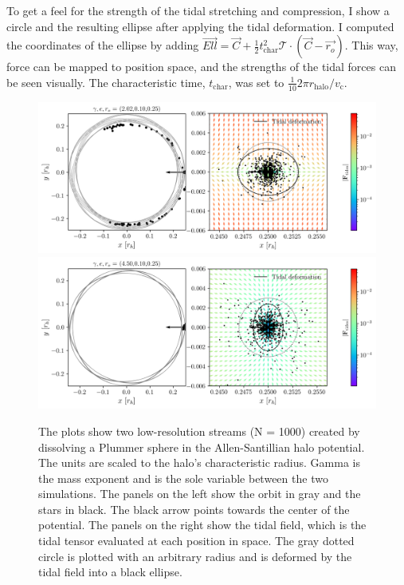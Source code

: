             To get a feel for the strength of the tidal stretching and compression, I show a circle and the resulting ellipse after applying the tidal deformation. I computed the coordinates of the ellipse by adding $\vec{Ell} = \vec{C} + \frac{1}{2} t_\textrm{char}^2 \mathcal{T}\cdot \left(\vec{C} - \vec{r_o}\right)$. This way, force can be mapped to position space, and the strengths of the tidal forces can be seen visually. The characteristic time, $t_\textrm{char}$, was set to $\frac{1}{10} 2\pi r_\textrm{halo} / v_\textrm{c}$. 
            \begin{figure}
                \includegraphics[width=\linewidth]{images/martos_tidal_field_202_10_25.png}
                \includegraphics[width=\linewidth]{images/martos_tidal_field_450_10_25.png}
                \caption{The plots show two low-resolution streams (N = 1000) created by dissolving a Plummer sphere in the Allen-Santillian halo potential. The units are scaled to the halo's characteristic radius. Gamma is the mass exponent and is the sole variable between the two simulations. The panels on the left show the orbit in gray and the stars in black. The black arrow points towards the center of the potential. The panels on the right show the tidal field, which is the tidal tensor evaluated at each position in space. The gray dotted circle is plotted with an arbitrary radius and is deformed by the tidal field into a black ellipse.}
                \label{fig:martos_tidal_field_small_r}
            \end{figure}

